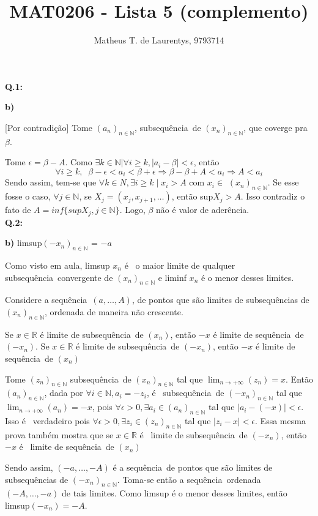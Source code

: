 \documentclass[12pt,twoside]{article}
\title{MAT0206 - Lista 5 (complemento)}
\author{Matheus T. de Laurentys, 9793714}
\newcommand{\adh}{aderência}
\newcommand{\n}{não }
\newcommand{\ent}{então }
\newcommand{\Ent}{Então }
\newcommand{\eh}{é }
\newcommand{\seq}{sequência}
\newcommand{\sao}{são }
\newcommand{\tambem}{também }
\newcommand{\contradicao}{contradição}
\newcommand{\limi}[2]{$\displaystyle{\lim_{n \to +\infty}}(#1)=#2$}
\newcommand{\N}{\mathbb{N}}
\newcommand{\seqi}[1]{$(#1_n)_{n\in\N}$}
\begin{document}
	\maketitle
		
	\noindent\textbf{Q.1:}
	
	\noindent\textbf{b)}
	
	
	[Por \contradicao] Tome \seqi{a}, sub\seq\ de \seqi{x}, que coverge pra $\beta$.
	
	Tome $\epsilon = \beta - A$. Como $\exists k\in\N | \forall i \ge k, |a_i - \beta| < \epsilon$, \ent
	$$
	\forall i \ge k,\;\; \beta -\epsilon < a_i < \beta + \epsilon \Rightarrow \beta - \beta + A < a_i \Rightarrow A < a_i
	$$
	Sendo assim, tem-se que $\forall k \in N, \exists i \ge k\;|\;x_i > A$ com $x_i \in$ \seqi{x}. Se esse fosse o caso, $\forall j \in \N$, se $X_j = (x_j, x_{j+1}, \ldots)$, \ent sup$X_j > A$. Isso contradiz o fato de $A = inf\{supX_j, j\in\N\}$. Logo, $\beta$ \n \eh valor de \adh.\\
	
	
	\noindent\textbf{Q.2:}
	
	\noindent\textbf{b)} limsup\seqi{-x} = $-a$
	
	Como visto em aula, limsup $x_n$ \eh\ o maior limite de qualquer sub\seq\ convergente de $(x_n)_{n\in\N}$ e liminf $x_n$ \eh o menor desses limites.
	
	Considere a \seq\ $(a, \ldots, A)$, de pontos que \sao limites de sub\seq s de $(x_n)_{n\in\mathbb{N}}$,  ordenada de maneira \n crescente.
	
	Se $x\in\mathbb{R}$ \eh limite de sub\seq\ de $(x_n)$, \ent $-x$ \eh limite de \seq\ de $(-x_n)$. Se $x\in\mathbb{R}$ \eh limite de sub\seq\ de $(-x_n)$, \ent $-x$ \eh limite de \seq\ de $(x_n)$
	
	\noindent [Prova] Tome $(z_n)_{n\in\mathbb{N}}$ sub\seq\ de $(x_n)_{n\in\mathbb{N}}$ tal que \limi{z_n}{x}. 
	\Ent $(a_n)_{n\in\mathbb{N}}$, dada por $\forall i\in\mathbb{N}, a_i = -z_i$, \eh\ sub\seq\ de $(-x_n)_{n\in\mathbb{N}}$ tal que \hbox{\limi{a_n}{-x}}, pois $\forall \epsilon > 0, \exists a_i \in (a_n)_{n\in\mathbb{N}}$ tal que $|a_i - (-x)| < \epsilon$. Isso \eh\ verdadeiro pois \hbox{$\forall \epsilon > 0, \exists z_i \in (z_n)_{n\in\mathbb{N}}$} tal que $|z_i -  x| < \epsilon$. Essa mesma prova \tambem mostra que se $x\in\mathbb{R}$ \eh\ limite de sub\seq\ de $(-x_n)$, \ent $-x$ \eh\ limite de \seq\ de $(x_n)$
	
	Sendo assim, $(-a,\ldots,-A)$ \eh a \seq\ de pontos que \sao limites de sub\seq s de $(-x_n)_{n\in\mathbb{N}}$. Toma-se \ent a \seq\ ordenada $(-A,\ldots,-a)$ de tais limites. Como limsup \eh o menor desses limites, \ent \hbox{limsup$(-x_n) = -A$}.\\
	
	
\end{document}

